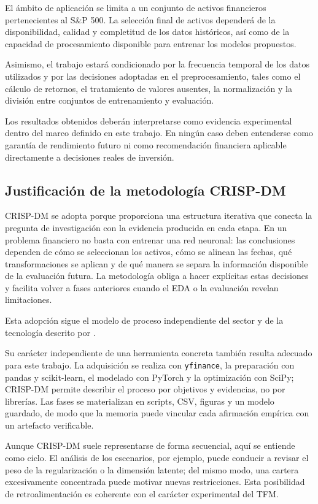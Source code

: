 El ámbito de aplicación se limita a un conjunto de activos financieros pertenecientes al S\&P 500. La selección final de activos dependerá de la disponibilidad, calidad y completitud de los datos históricos, así como de la capacidad de procesamiento disponible para entrenar los modelos propuestos.

Asimismo, el trabajo estará condicionado por la frecuencia temporal de los datos utilizados y por las decisiones adoptadas en el preprocesamiento, tales como el cálculo de retornos, el tratamiento de valores ausentes, la normalización y la división entre conjuntos de entrenamiento y evaluación.

Los resultados obtenidos deberán interpretarse como evidencia experimental dentro del marco definido en este trabajo. En ningún caso deben entenderse como garantía de rendimiento futuro ni como recomendación financiera aplicable directamente a decisiones reales de inversión.

\subsection{Justificación de la metodología CRISP-DM}
CRISP-DM se adopta porque proporciona una estructura iterativa que conecta la pregunta de investigación con la evidencia producida en cada etapa. En un problema financiero no basta con entrenar una red neuronal: las conclusiones dependen de cómo se seleccionan los activos, cómo se alinean las fechas, qué transformaciones se aplican y de qué manera se separa la información disponible de la evaluación futura. La metodología obliga a hacer explícitas estas decisiones y facilita volver a fases anteriores cuando el EDA o la evaluación revelan limitaciones.

Esta adopción sigue el modelo de proceso independiente del sector y de la tecnología descrito por \cite{wirth2000crispdm}.

Su carácter independiente de una herramienta concreta también resulta adecuado para este trabajo. La adquisición se realiza con \texttt{yfinance}, la preparación con pandas y scikit-learn, el modelado con PyTorch y la optimización con SciPy; CRISP-DM permite describir el proceso por objetivos y evidencias, no por librerías. Las fases se materializan en scripts, CSV, figuras y un modelo guardado, de modo que la memoria puede vincular cada afirmación empírica con un artefacto verificable.

Aunque CRISP-DM suele representarse de forma secuencial, aquí se entiende como ciclo. El análisis de los escenarios, por ejemplo, puede conducir a revisar el peso de la regularización o la dimensión latente; del mismo modo, una cartera excesivamente concentrada puede motivar nuevas restricciones. Esta posibilidad de retroalimentación es coherente con el carácter experimental del TFM.

